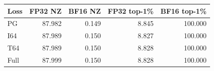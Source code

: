 \begin{tabular}{lrrrr}
\toprule
Loss & FP32 NZ & BF16 NZ & FP32 top-1\% & BF16 top-1\% \\
\midrule
PG & 87.982 & 0.149 & 8.845 & 100.000 \\
I64 & 87.989 & 0.150 & 8.827 & 100.000 \\
T64 & 87.989 & 0.150 & 8.828 & 100.000 \\
Full & 87.999 & 0.150 & 8.828 & 100.000 \\
\bottomrule
\end{tabular}
